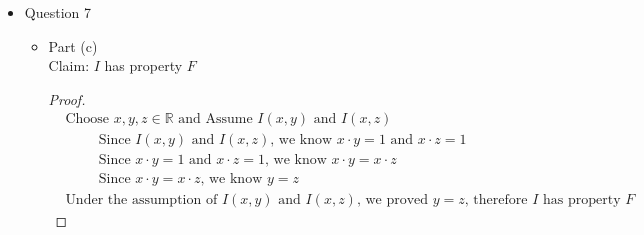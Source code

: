 \documentclass{article}
\begin{document}
\begin{itemize}
\begin{itemize}
\begin{proof}
\begin{align}
                &\hspace{2cm} \text{Since } x = 1y \text{, we know } x = y \\
                &\hspace{1cm} \text{Case 2: } y=0 \\
                &\hspace{2cm} \text{Since } y=0 \text{ and } x=ky \text{, we know } x=0k \\
                &\hspace{2cm} \text{Since } x=0k \text{, we know } x=0 \\
                &\hspace{2cm} \text{Since } y=0 \text{ and } x=0 \text{, we know} x=y \\
                &\hspace{1cm} \text{In either case, we proved } x=y \text{, so we know } x=y \text{ in general} \\
                &\text{Under the assumption of $M(x,y)$ and $M(y,x)$, we proved $x=y$, so $M$ is anti-symmetric}
            \end{align}
        \end{proof}
    \end{itemize}
    \item Question 7
    \begin{itemize}
        \item Part (c) \\
        Claim: $I$ has property $F$
        \begin{proof}
            \begin{align}
                &\text{Choose } x,y,z \in \mathbb{R} \text{ and Assume } I(x,y) \text{ and } I(x,z) \\
                &\hspace{1cm} \text{Since } I(x,y) \text{ and } I(x,z) \text{, we know } x \cdot y=1 \text{ and } x \cdot z = 1 \\
                &\hspace{1cm} \text{Since } x \cdot y=1 \text{ and } x \cdot z = 1 \text{, we know } x \cdot y=x \cdot z \\
                &\hspace{1cm} \text{Since } x \cdot y=x \cdot z \text{, we know } y=z \\
                &\text{Under the assumption of } I(x,y) \text{ and } I(x,z) \text{, we proved } y = z \text{, therefore } I \text{ has property } F
            \end{align}
        \end{proof}
    \end{itemize}
\end{itemize}
\end{document}
